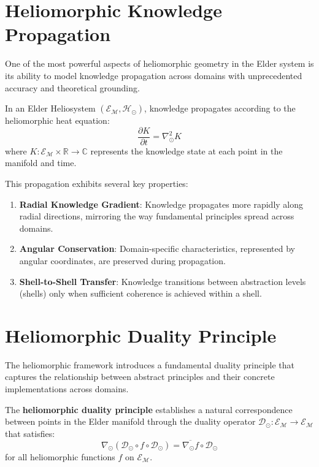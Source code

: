 \section{Heliomorphic Knowledge Propagation}

One of the most powerful aspects of heliomorphic geometry in the Elder system is its ability to model knowledge propagation across domains with unprecedented accuracy and theoretical grounding.

\begin{proposition}
In an Elder Heliosystem $(\mathcal{E}_{\mathcal{M}}, \mathcal{H}_{\odot})$, knowledge propagates according to the heliomorphic heat equation:
\begin{equation}
\frac{\partial K}{\partial t} = \nabla_{\odot}^2 K
\end{equation}
where $K: \mathcal{E}_{\mathcal{M}} \times \mathbb{R} \rightarrow \mathbb{C}$ represents the knowledge state at each point in the manifold and time.
\end{proposition}

This propagation exhibits several key properties:

\begin{enumerate}
    \item \textbf{Radial Knowledge Gradient}: Knowledge propagates more rapidly along radial directions, mirroring the way fundamental principles spread across domains.
    
    \item \textbf{Angular Conservation}: Domain-specific characteristics, represented by angular coordinates, are preserved during propagation.
    
    \item \textbf{Shell-to-Shell Transfer}: Knowledge transitions between abstraction levels (shells) only when sufficient coherence is achieved within a shell.
\end{enumerate}

\section{Heliomorphic Duality Principle}

The heliomorphic framework introduces a fundamental duality principle that captures the relationship between abstract principles and their concrete implementations across domains.

\begin{definition}
The \textbf{heliomorphic duality principle} establishes a natural correspondence between points in the Elder manifold through the duality operator $\mathcal{D}_{\odot}: \mathcal{E}_{\mathcal{M}} \rightarrow \mathcal{E}_{\mathcal{M}}$ that satisfies:
\begin{equation}
\nabla_{\odot} (\mathcal{D}_{\odot} \circ f \circ \mathcal{D}_{\odot}) = \overline{\nabla_{\odot} f} \circ \mathcal{D}_{\odot}
\end{equation}
for all heliomorphic functions $f$ on $\mathcal{E}_{\mathcal{M}}$.
\end{definition}

